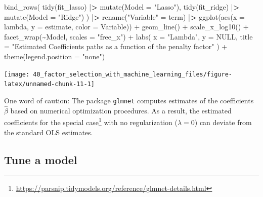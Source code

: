 \documentclass[
]{book}
\newenvironment{Shaded}{\begin{snugshade}}{\end{snugshade}}
\newcommand{\AttributeTok}[1]{\textcolor[rgb]{0.61,0.61,0.61}{#1}}
\newcommand{\ConstantTok}[1]{\textcolor[rgb]{0,0,0}{#1}}
\newcommand{\ErrorTok}[1]{\textcolor[rgb]{0.14,0.14,0.14}{\textbf{#1}}}
\newcommand{\FunctionTok}[1]{\textcolor[rgb]{0,0,0}{#1}}
\newcommand{\NormalTok}[1]{#1}
\newcommand{\OtherTok}[1]{\textcolor[rgb]{0.37,0.37,0.37}{#1}}
\newcommand{\SpecialCharTok}[1]{\textcolor[rgb]{0,0,0}{#1}}
\newcommand{\StringTok}[1]{\textcolor[rgb]{0.5,0.5,0.5}{#1}}
\renewcommand{\href}[2]{#2\footnote{\url{#1}}}
\begin{document}
\begin{Shaded}
\begin{Highlighting}[]
\FunctionTok{bind\_rows}\NormalTok{(}
  \FunctionTok{tidy}\NormalTok{(fit\_lasso) }\SpecialCharTok{|}\ErrorTok{\textgreater{}} \FunctionTok{mutate}\NormalTok{(}\AttributeTok{Model =} \StringTok{"Lasso"}\NormalTok{),}
  \FunctionTok{tidy}\NormalTok{(fit\_ridge) }\SpecialCharTok{|}\ErrorTok{\textgreater{}} \FunctionTok{mutate}\NormalTok{(}\AttributeTok{Model =} \StringTok{"Ridge"}\NormalTok{)}
\NormalTok{) }\SpecialCharTok{|}\ErrorTok{\textgreater{}}
  \FunctionTok{rename}\NormalTok{(}\StringTok{"Variable"} \OtherTok{=}\NormalTok{ term) }\SpecialCharTok{|}\ErrorTok{\textgreater{}}
  \FunctionTok{ggplot}\NormalTok{(}\FunctionTok{aes}\NormalTok{(}\AttributeTok{x =}\NormalTok{ lambda, }\AttributeTok{y =}\NormalTok{ estimate, }\AttributeTok{color =}\NormalTok{ Variable)) }\SpecialCharTok{+}
  \FunctionTok{geom\_line}\NormalTok{() }\SpecialCharTok{+}
  \FunctionTok{scale\_x\_log10}\NormalTok{() }\SpecialCharTok{+}
  \FunctionTok{facet\_wrap}\NormalTok{(}\SpecialCharTok{\textasciitilde{}}\NormalTok{Model, }\AttributeTok{scales =} \StringTok{"free\_x"}\NormalTok{) }\SpecialCharTok{+}
  \FunctionTok{labs}\NormalTok{(}
    \AttributeTok{x =} \StringTok{"Lambda"}\NormalTok{, }\AttributeTok{y =} \ConstantTok{NULL}\NormalTok{,}
    \AttributeTok{title =} \StringTok{"Estimated Coefficients paths as a}
\StringTok{    function of the penalty factor"}
\NormalTok{  ) }\SpecialCharTok{+}
  \FunctionTok{theme}\NormalTok{(}\AttributeTok{legend.position =} \StringTok{"none"}\NormalTok{)}
\end{Highlighting}
\end{Shaded}

\begin{center}\texttt{[image: 40\_factor\_selection\_with\_machine\_learning\_files/figure-latex/unnamed-chunk-11-1]} \end{center}

One word of caution: The package \texttt{glmnet} computes estimates of the coefficients \(\hat\beta\) based on numerical optimization procedures.
As a result, the estimated coefficients for the \href{https://parsnip.tidymodels.org/reference/glmnet-details.html}{special case} with no regularization (\(\lambda = 0\)) can deviate from the standard OLS estimates.

\hypertarget{tune-a-model}{%
\subsection{Tune a model}\label{tune-a-model}}
\end{document}
